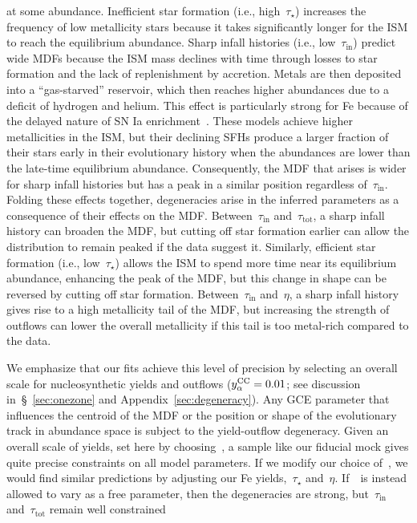 \documentclass[ms.tex]{subfiles}
\begin{document}
at some abundance.
Inefficient star formation (i.e., high~$\tau_\star$) increases the frequency of
low metallicity stars because it takes significantly longer for the ISM to
reach the equilibrium abundance.
Sharp infall histories (i.e., low~$\tau_\text{in}$) predict wide MDFs because
the ISM mass declines with time through losses to star formation and the lack
of replenishment by accretion.
Metals are then deposited into a ``gas-starved'' reservoir, which then reaches
higher abundances due to a deficit of hydrogen and helium.
This effect is particularly strong for Fe because of the delayed nature of SN
Ia enrichment~\citep{Weinberg2017}.
These models achieve higher metallicities in the ISM, but their declining SFHs
produce a larger fraction of their stars early in their evolutionary history
when the abundances are lower than the late-time equilibrium abundance.
Consequently, the MDF that arises is wider for sharp infall histories but has
a peak in a similar position regardless of~$\tau_\text{in}$.
Folding these effects together, degeneracies arise in the inferred parameters
as a consequence of their effects on the MDF.
Between~$\tau_\text{in}$ and~$\tau_\text{tot}$, a sharp infall history can
broaden the MDF, but cutting off star formation earlier can allow the
distribution to remain peaked if the data suggest it.
Similarly, efficient star formation (i.e., low~$\tau_\star$) allows the ISM to
spend more time near its equilibrium abundance, enhancing the peak of the MDF,
but this change in shape can be reversed by cutting off star formation.
Between~$\tau_\text{in}$ and~$\eta$, a sharp infall history gives rise to a
high metallicity tail of the MDF, but increasing the strength of outflows
can lower the overall metallicity if this tail is too metal-rich compared to
the data.
\par
We emphasize that our fits achieve this level of precision by selecting an
overall scale for nucleosynthetic yields and outflows ($y_\alpha^\text{CC} = 0.01$; see
discussion in~\S~\ref{sec:onezone} and Appendix~\ref{sec:degeneracy}).
Any GCE parameter that influences the centroid of the MDF or the position or
shape of the evolutionary track in abundance space is subject to the
yield-outflow degeneracy.
Given an overall scale of yields, set here by choosing~\yacc, a sample like
our fiducial mock gives quite precise constraints on all model parameters.
If we modify our choice of~\yacc, we would find similar predictions by
adjusting our Fe yields,~$\tau_\star$ and~$\eta$.
If~\yacc~is instead allowed to vary as a free parameter, then the degeneracies
are strong, but~$\tau_\text{in}$ and~$\tau_\text{tot}$ remain well constrained
\end{document}
